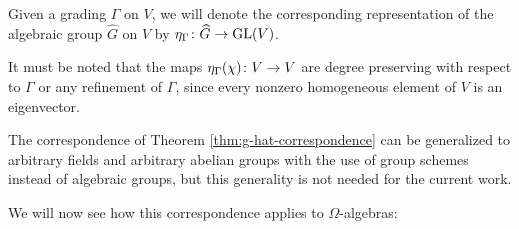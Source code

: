 \begin{notation}
	Given a grading $\Gamma$ on $V$, we will denote the corresponding representation of the algebraic group $\widehat G$ on $V$ by $\eta_\Gamma\colon \widehat G \to \operatorname{GL}(V)$.
\end{notation}

\begin{remark}\label{rmk:G-hat-preserves-degree}
    It must be noted that the maps $\eta_\Gamma(\chi)\colon V \to V$ are degree preserving with respect to $\Gamma$ or any refinement of $\Gamma$, since every nonzero homogeneous element of $V$ is an eigenvector. 
\end{remark}

	The correspondence of Theorem \ref{thm:g-hat-correspondence} can be generalized to arbitrary fields and arbitrary abelian groups with the use of group schemes instead of algebraic groups, but this generality is not needed for the current work.

We will now see how this correspondence applies to $\Omega$-algebras:






